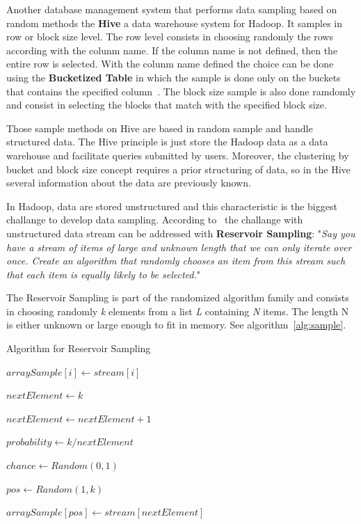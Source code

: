 Another database management system that performs data sampling based on random methods
the {\bf Hive} a data warehouse system for Hadoop. It samples in
row or block size level. The row level consists in choosing randomly the rows
according with the colunm name. If the column name is not defined, then the entire row
is selected. With the colunm name defined the choice can be done using the
{\bf Bucketized Table} in which the sample is done only on the buckets that contains
the specified column~\cite{hiveSample}. The block size sample is also done ramdomly
and consist in selecting the blocks that match with the specified block size.

Those sample methods on Hive are based in random sample and handle structured data.
The Hive principle is just store the Hadoop data as a data warehouse and facilitate
queries submitted by users. Moreover, the clustering by bucket and block size concept
requires a prior structuring of data, so in the Hive several information about the
data are previously known.

In Hadoop, data are stored unstructured and this characteristic is the
biggest challange to develop data sampling. According to~\cite{vitter:1985, cloudera, greg, wikipedia:ReservoirSampling}
the challange with unstructured data stream can be addressed with {\bf Reservoir Sampling}:
"{\it Say you have a stream of items of large and unknown length that we can only
iterate over once. Create an algorithm that randomly chooses an item from this
stream such that each item is equally likely to be selected.}"

The Reservoir Sampling is part of the randomized algorithm family and consists in
choosing randomly {\it k} elements from a list {\it L} containing {\it N} items.
The length N is either unknown or large enough to fit in memory. See algorithm~\ref{alg:sample}.

\begin{algorithm}
		\caption{Algorithm for Reservoir Sampling \label{alg:sample}}


		 {
			$arraySample[i] \leftarrow stream[i]$
		}

		$nextElement \leftarrow k$

		 {
			$nextElement \leftarrow nextElement + 1$

            $probability \leftarrow k/nextElement$

			$chance \leftarrow Random(0,1)$

			{
                $pos \leftarrow Random(1,k)$

				$arraySample[pos] \leftarrow stream[nextElement]$
			}
		}

\end{algorithm}

